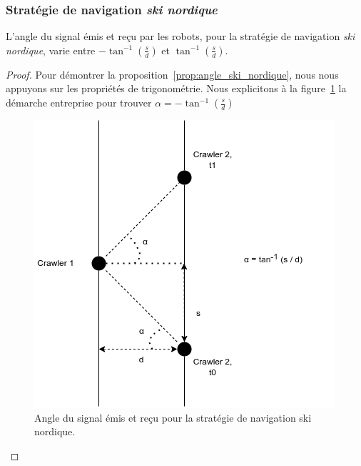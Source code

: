 \documentclass[francais,RandD]{rapportPFE}
\begin{document}
			\subsubsection*{Stratégie de navigation \textit{ski nordique}}
				\begin{Proposition}
					L'angle du signal émis et reçu par les robots, pour la stratégie de navigation \textit{ski nordique}, varie entre $-\tan^{-1}(\frac{s}{d})$ et $\tan^{-1}(\frac{s}{d})$.
					\label{prop:angle_ski_nordique}
				\end{Proposition}
				\begin{proof}
					Pour démontrer la proposition~\ref{prop:angle_ski_nordique}, nous nous appuyons sur les propriétés de trigonométrie.
					Nous explicitons à la figure~\ref{fig:angle_ski_nordique} la démarche entreprise pour trouver $\alpha = -\tan^{-1}(\frac{s}{d})$

					\begin{figure}[h!]
						\centering
						\includegraphics[scale=0.5]{graphics/angle_ski_nordique.png}
						\caption{Angle du signal émis et reçu pour la stratégie de navigation ski nordique.}
						\label{fig:angle_ski_nordique}
					\end{figure}
				\end{proof}
\end{document}
